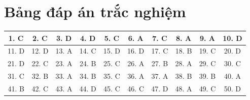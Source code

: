 \documentclass[12pt,a4paper]{article}
\begin{document}
\clearpage\section*{Bảng đáp án trắc nghiệm}
\begin{center}\begin{tabular}{|c|c|c|c|c|c|c|c|c|c|}
\hline
1. C & 2. C & 3. D & 4. D & 5. C & 6. A & 7. C & 8. A & 9. A & 10. D\\\hline
11. D & 12. D & 13. A & 14. C & 15. D & 16. D & 17. C & 18. B & 19. C & 20. D\\\hline
21. D & 22. C & 23. A & 24. B & 25. C & 26. A & 27. B & 28. A & 29. C & 30. C\\\hline
31. C & 32. B & 33. A & 34. B & 35. C & 36. A & 37. A & 38. B & 39. B & 40. A\\\hline
41. B & 42. C & 43. A & 44. D & 45. C & 46. C & 47. D & 48. A & 49. C & 50. D\\\hline
\end{tabular}\end{center}
\end{document}
